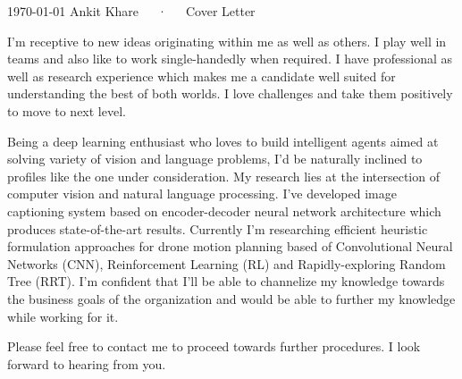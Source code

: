 \documentclass[11pt, a4paper]{awesome-cv}
\begin{document}
\makecvheader[R]

\makecvfooter
  {\today}
  {Ankit Khare~~~·~~~Cover Letter}
  {}

\makelettertitle
\begin{cvletter}

I'm receptive to new ideas originating within me as well as others. I play well in teams and also like to work single-handedly when required. I have professional as well as research experience which makes me a candidate well suited for understanding the best of both worlds. I love challenges and take them positively to move to next level. 

Being a deep learning enthusiast who loves to build intelligent  agents aimed at solving variety of vision and language problems, I'd be naturally inclined to profiles like the one under consideration. My research lies at the intersection of computer vision and natural language processing. I've developed image captioning system based on encoder-decoder neural network architecture which produces state-of-the-art results. Currently I’m researching efficient heuristic formulation approaches for drone motion planning based of Convolutional Neural Networks (CNN), Reinforcement Learning (RL) and Rapidly-exploring Random Tree (RRT). I'm confident that I'll be able to channelize my knowledge towards the business goals of the organization and would be able to further my knowledge while working for it.

  Please feel free to contact me to proceed towards further procedures. I look forward to hearing from you.  

\end{cvletter}


\makeletterclosing
\end{document}
